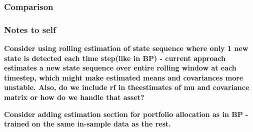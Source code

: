 \subsubsection{Comparison}



\subsubsection{Notes to self}


\textbf{Consider using rolling estimation of state sequence where only 1 new state is detected each time step(like in BP) - current approach estimates a new state sequence over entire rolling window at each timestep, which might make estimated means and covariances more unstable. Also, do we include rf in theestimates of mu and covariance matrix or how do we handle that asset?}

\textbf{Consider adding estimation section for portfolio allocation as in BP - trained on the same in-sample data as the rest.}